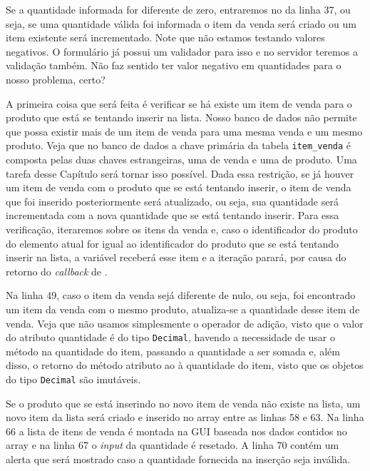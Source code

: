 Se a quantidade informada for diferente de zero, entraremos no  da linha 37, ou seja, se uma quantidade válida foi informada o item da venda será criado ou um item existente será incrementado. Note que não estamos testando valores negativos. O formulário já possui um validador para isso e no servidor teremos a validação também. Não faz sentido ter valor negativo em quantidades para o nosso problema, certo?

A primeira coisa que será feita é verificar se há existe um item de venda para o produto que está se tentando inserir na lista. Nosso banco de dados não permite que possa existir mais de um item de venda para uma mesma venda e um mesmo produto. Veja que no banco de dados a chave primária da tabela \texttt{item\_venda} é composta pelas duas chaves estrangeiras, uma de venda e uma de produto. Uma tarefa desse Capítulo será tornar isso possível. Dada essa restrição, se já houver um item de venda com o produto que se está tentando inserir, o item de venda que foi inserido posteriormente será atualizado, ou seja, sua quantidade será incrementada com a nova quantidade que se está tentando inserir. Para essa verificação, iteraremos sobre os itens da venda e, caso o identificador do produto do elemento atual for igual ao identificador do produto que se está tentando inserir na lista, a variável  receberá esse item e a iteração parará, por causa do retorno  do \textit{callback} de .

Na linha 49, caso o item da venda sejá diferente de nulo, ou seja, foi encontrado um item da venda com o mesmo produto, atualiza-se a quantidade desse item de venda. Veja que não usamos simplesmente o operador de adição, visto que o valor do atributo quantidade é do tipo \texttt{Decimal}, havendo a necessidade de usar o método  na quantidade do item, passando a quantidade a ser somada e, além disso, o retorno do método atributo ao à quantidade do item, visto que os objetos do tipo \texttt{Decimal} são imutáveis.

Se o produto que se está inserindo no novo item de venda não existe na lista, um novo item da lista será criado e inserido no array entre as linhas 58 e 63. Na linha 66 a lista de itens de venda é montada na GUI baseada nos dados contidos no array  e na linha 67 o \textit{input} da quantidade é resetado. A linha 70 contém um alerta que será mostrado caso a quantidade fornecida na inserção seja inválida.

